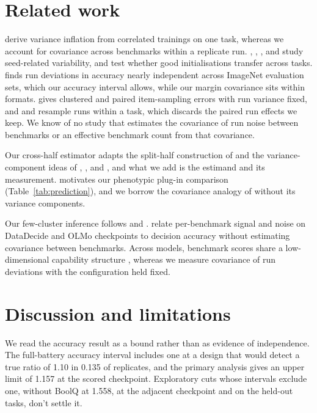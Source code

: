 \section{Related work}
\citet{bouthillier2021} derive variance inflation from correlated trainings on one task, whereas we account for covariance across benchmarks within a replicate run. \citet{reimers2017}, \citet{zhou2020}, \citet{madaan2024}, and \citet{fehlauer2025} study seed-related variability, and \citet{dodge2020} test whether good initialisations transfer across tasks. \citet{jordan2024} finds run deviations in accuracy nearly independent across ImageNet evaluation sets, which our accuracy interval allows, while our margin covariance sits within formats. \citet{miller2024} gives clustered and paired item-sampling errors with run variance fixed, and \citet{henderson2018} and \citet{agarwal2021} resample runs within a task, which discards the paired run effects we keep. We know of no study that estimates the covariance of run noise between benchmarks or an effective benchmark count from that covariance.

Our cross-half estimator adapts the split-half construction of \citet{spearman1910,brown1910} and the variance-component ideas of \citet{spearman1904}, \citet{cronbach1951}, and \citet{searle1992}, and what we add is the estimand and its measurement. \citet{cheverud1988} motivates our phenotypic plug-in comparison (Table~\ref{tab:prediction}), and we borrow the covariance analogy of \citet{martin1977} without its variance components.

Our few-cluster inference follows \citet{cameron2008} and \citet{mackinnon2017}. \citet{heineman2025} relate per-benchmark signal and noise on DataDecide and OLMo checkpoints to decision accuracy without estimating covariance between benchmarks. Across models, benchmark scores share a low-dimensional capability structure \citep{ruan2024,burnell2023revealing}, whereas we measure covariance of run deviations with the configuration held fixed.

\section{Discussion and limitations}
We read the accuracy result as a bound rather than as evidence of independence. The full-battery accuracy interval includes one at a design that would detect a true ratio of 1.10 in 0.135 of replicates, and the primary analysis gives an upper limit of 1.157 at the scored checkpoint. Exploratory cuts whose intervals exclude one, without BoolQ at 1.558, at the adjacent checkpoint and on the held-out tasks, don't settle it.

